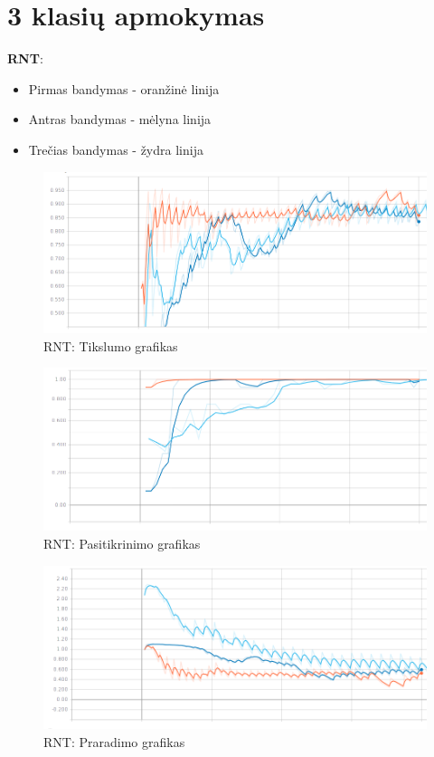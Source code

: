 \documentclass{VUMIFPSbakalaurinis}
\begin{document}
\section{3 klasių apmokymas}
\label{appendix:3kl}

\textbf{RNT}:
\begin{itemize}
	\item Pirmas bandymas - oranžinė linija
	\item Antras bandymas - mėlyna linija
	\item Trečias bandymas - žydra linija
\end{itemize}

\begin{figure}[H]
	\centering
	\includegraphics[scale=0.3]{img/1/acc}
	\caption{RNT: Tikslumo grafikas}
	\label{img:3acc}
\end{figure}

\begin{figure}[H]
	\centering
	\includegraphics[scale=0.3]{img/1/val}
	\caption{RNT: Pasitikrinimo grafikas}
	\label{img:3val}
\end{figure}

\begin{figure}[H]
	\centering
	\includegraphics[scale=0.3]{img/1/loss}
	\caption{RNT: Praradimo grafikas}
	\label{img:3loss}
\end{figure}
\end{document}
